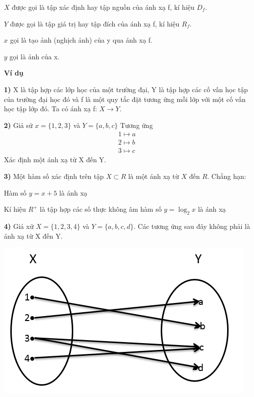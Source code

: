 \documentclass[12pt,oneside,a4paper,reqno]{book}
\begin{document}
\centerline {}

$X$ được gọi là tập xác định hay tập nguồn của ánh xạ f, kí hiệu $D_f$.

$Y$ được gọi là tập giá trị hay tập đích của ánh xạ f, kí hiệu $R_f$.

$x$  gọi là tạo ảnh (nghịch ảnh) của y qua ánh xạ f.

$y$  gọi là ảnh của x.

\textbf{Ví dụ }

\textbf{1)} X là tập hợp các lớp học của một trường đại, Y là tập hợp các cố vấn học tập của trường đại học đó và f là một quy tắc đặt tương ứng mỗi lớp với một cố vấn học tập lớp đó. Ta có ánh xạ f:  $X\to Y$.

\textbf{2)} Giả sử  $x=\{1,2,3\}$ và $Y=\{a,b,c\}$
Tương ứng
\begin{align*}
1 \mapsto a\\
2 \mapsto b\\
3 \mapsto c
\end{align*}
Xác định một ánh xạ từ X đến Y.

\textbf{3) }Một hàm số xác định trên tập $X\subset R$ là một ánh xạ từ $X$ đến $R$. Chẳng hạn:

Hàm số $y=x+5$ là ánh xạ

\centerline {}


Kí hiệu $R^+$ là tập hợp các số thực không âm hàm số $y=\log_2 x$ là ánh xạ
\centerline{}


\textbf{4)} Giả xử $X=\{1,2,3,4\}$ và $Y=\{a,b,c,d\}$. Các tương ứng sau đây không phải là ánh xạ từ X đến Y.

\includegraphics{hinh1}
\end{document}
